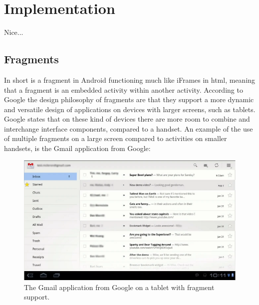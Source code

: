 \chapter{Implementation}
Nice...

\section{Fragments}

In short is a fragment in Android functioning much like iFrames in html, meaning that a fragment is an embedded activity within another activity.
According to Google the design philosophy of fragments are that they support a more dynamic and versatile design of applications on devices with larger screens, such as tablets.
Google states that on these kind of devices there are more room to combine and interchange interface components, compared to a handset. 
An example of the use of multiple fragments on a large screen compared to activities on smaller handsets, is the Gmail application from Google:


\begin{figure}[H]
	\centering
		\includegraphics[scale=0.5]{Images/Implementation/fragment_gmail.png}
			\caption{The Gmail application from Google on a tablet with fragment support.}
	\label{fig:fragment_gmail}
\end{figure}

